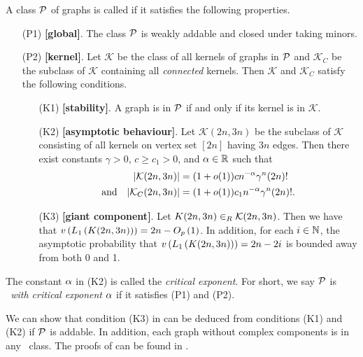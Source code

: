 \begin{definition}\label{CBdef:planar_like}
A class $\mathcal{P}$ of graphs is called {\em \pl} if it satisfies the following properties.
	\begin{itemize}[labelsep=0.5mm]
		\item[(P1)] \textbf{[global]}. The class $\mathcal{P}$ is weakly addable and closed under taking minors. \\ 
		\item[(P2)] \textbf{[kernel]}. Let $\mathcal{K}$ be the class of all kernels of graphs in $\mathcal{P}$ and $\mathcal{K}_C$ be the subclass of $\mathcal{K}$ containing all {\em connected} kernels. Then $\mathcal{K}$ and $\mathcal{K}_C$ satisfy the following conditions. 
		\begin{itemize}
			\item[(K1)] \textbf{[stability]}. 
			A graph is in $\mathcal{P}$ if and only if its kernel is in $\mathcal{K}$.
			\item[(K2)] \textbf{[asymptotic behaviour]}. Let $\mathcal{K}(2n,3n)$ be the subclass of $\mathcal{K}$ consisting of all kernels on vertex set $[2n]$ having $3n$ edges. Then there exist constants $\gamma>0$, $c\geq c_1>0$, and $\alpha \in \mathbb{R}$ such that 
			\begin{align*}
			|\mathcal{K}(2n, 3n)|&=(1+o(1))cn^{-\alpha}\gamma^{n}(2n)! \\
			\text{and} \quad 
			|\mathcal{K}_C(2n, 3n)|&=(1+o(1))c_1n^{-\alpha}\gamma^{n}(2n)!.
			\end{align*}
		\item[(K3)] \textbf{[giant component]}. Let $K(2n,3n) \in_R \mathcal{K}(2n, 3n)$. Then we have that $v\left({L_1\left(K(2n,3n)\right)}\right)=2n-O_p\left(1\right)$. In addition, for each $i \in \mathbb{N}$, the asymptotic probability that $v\left({L_1\left(K(2n,3n)\right)}\right)=2n-2i$ is bounded away from both 0 and 1. 
 		\end{itemize}
	\end{itemize}
The constant $\alpha$ in (K2) is called the {\em critical exponent}. For short, we say $\mathcal{P}$ is {\em \pl\ with critical exponent $\alpha$} if it satisfies (P1) and (P2).
\end{definition}

We can show that condition (K3) in  can be deduced from conditions (K1) and (K2) if $\mathcal{P}$ is addable. In addition, each graph without complex components is in any \pl\ class. The proofs of  can be found in .

